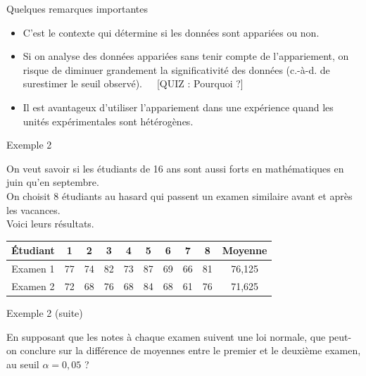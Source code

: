 \documentclass{BeamerTemplate}
\begin{document}
\begin{frame}[t]{Quelques remarques importantes}
\begin{itemize}
\item<1-> C'est \alert{le contexte} qui détermine si les données sont appariées ou non.
\item<2-> Si on analyse des données appariées sans tenir compte de l'appariement, on risque de diminuer grandement la significativité des données (c.-à-d. de surestimer le seuil observé).\ \ \ [QUIZ : Pourquoi ?]
\item<3-> Il est avantageux d'utiliser l'appariement dans une expérience \alert{quand les unités expérimentales sont hétérogènes}.
\end{itemize}
\end{frame}

\begin{frame}[t]{Exemple 2}


On veut savoir si les étudiants de 16 ans sont aussi forts en mathématiques en juin qu'en septembre. \\On choisit 8 étudiants au hasard qui passent un examen similaire avant et après les vacances. \\Voici leurs résultats.



\begin{center}
\begin{tabular}{|c|cccccccc|c|}\hline
Étudiant & 1 & 2 & 3 & 4 & 5 & 6 & 7 & 8 & Moyenne\\ \hline
Examen 1 & 77 & 74 & 82 & 73 & 87 & 69 & 66 & 81& 76,125\\
Examen 2 & 72 & 68 & 76 & 68 & 84 & 68 & 61 & 76 &71,625\\ \hline
\end{tabular}
\end{center}

\bigskip
\end{frame}

\begin{frame}[t]{Exemple 2 (suite)}

En supposant que les notes à chaque examen suivent une loi normale, que peut-on conclure sur la différence de moyennes entre le premier et le deuxième examen, au seuil $\alpha=0,05$ ?

{\ }
\end{frame}
\end{document}
